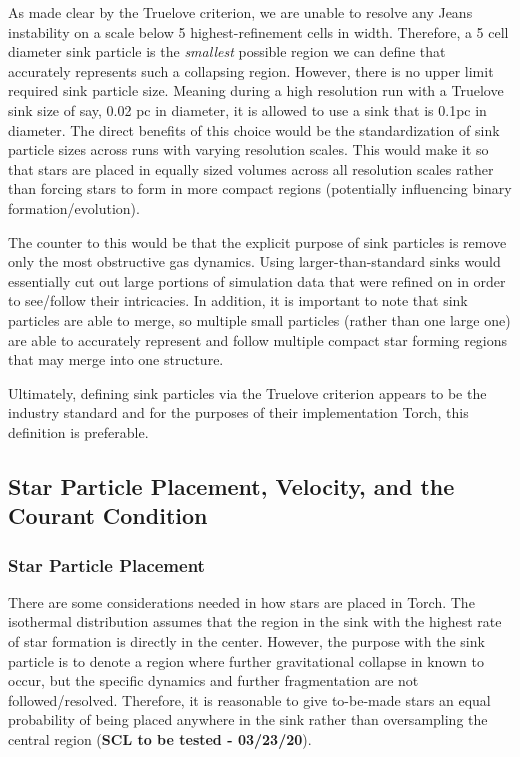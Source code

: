 \documentclass[10pt]{article}
\begin{document}
As made clear by the Truelove criterion, we are unable to resolve any Jeans instability on a scale below 5 highest-refinement cells in width. Therefore, a 5 cell diameter sink particle is the \emph{smallest} possible region we can define that accurately represents such a collapsing region. However, there is no upper limit required sink particle size. Meaning during a high resolution run with a Truelove sink size of say, 0.02 pc in diameter, it is allowed to use a sink that is 0.1pc in diameter. The direct benefits of this choice would be the standardization of sink particle sizes across runs with varying resolution scales. This would make it so that stars are placed in equally sized volumes across all resolution scales rather than forcing stars to form in more compact regions (potentially influencing binary formation/evolution).

The counter to this would be that the explicit purpose of sink particles is remove only the most obstructive gas dynamics. Using larger-than-standard sinks would essentially cut out large portions of simulation data that were refined on in order to see/follow their intricacies. In addition, it is important to note that sink particles are able to merge, so multiple small particles (rather than one large one) are able to accurately represent and follow multiple compact star forming regions that may merge into one structure.

Ultimately, defining sink particles via the Truelove criterion appears to be the industry standard and for the purposes of their implementation Torch, this definition is preferable.


\subsection{Star Particle Placement, Velocity, and the Courant Condition}

\subsubsection{Star Particle Placement}
There are some considerations needed in how stars are placed in Torch. The isothermal distribution assumes that the region in the sink with the highest rate of star formation is directly in the center. However, the purpose with the sink particle is to denote a region where further gravitational collapse in known to occur, but the specific dynamics and further fragmentation are not followed/resolved. Therefore, it is reasonable to give to-be-made stars an equal probability of being placed anywhere in the sink rather than oversampling the central region (\textbf{SCL to be tested - 03/23/20}).
\end{document}
